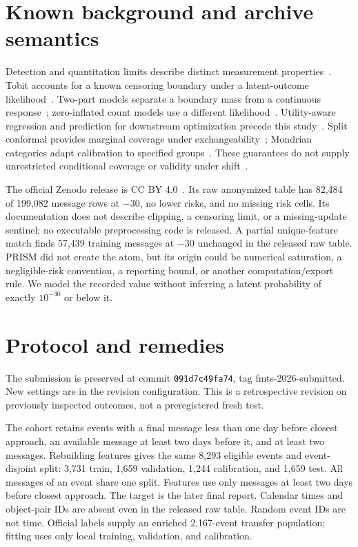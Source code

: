 \documentclass[10pt]{article}
\begin{document}
\section{Known background and archive semantics}
Detection and quantitation limits describe distinct measurement properties~\cite{currie}. Tobit accounts for a known censoring boundary under a latent-outcome likelihood~\cite{tobin}. Two-part models separate a boundary mass from a continuous response~\cite{cragg}; zero-inflated count models use a different likelihood~\cite{lambert}. Utility-aware regression and prediction for downstream optimization precede this study~\cite{torgo,spo}. Split conformal provides marginal coverage under exchangeability~\cite{lei}; Mondrian categories adapt calibration to specified groups~\cite{mondrian}. These guarantees do not supply unrestricted conditional coverage or validity under shift~\cite{barber}.

The official Zenodo release is CC BY 4.0~\cite{data}. Its raw anonymized table has 82,484 of 199,082 message rows at $-30$, no lower risks, and no missing risk cells. Its documentation does not describe clipping, a censoring limit, or a missing-update sentinel; no executable preprocessing code is released. A partial unique-feature match finds 57,439 training messages at $-30$ unchanged in the released raw table. PRISM did not create the atom, but its origin could be numerical saturation, a negligible-risk convention, a reporting bound, or another computation/export rule. We model the recorded value without inferring a latent probability of exactly $10^{-30}$ or below it.

\section{Protocol and remedies}
The submission is preserved at commit \texttt{091d7c49fa74}, tag fmts-2026-submitted. New settings are in the revision configuration. This is a retrospective revision on previously inspected outcomes, not a preregistered fresh test.

The cohort retains events with a final message less than one day before closest approach, an available message at least two days before it, and at least two messages. Rebuilding features gives the same 8,293 eligible events and event-disjoint split: 3,731 train, 1,659 validation, 1,244 calibration, and 1,659 test. All messages of an event share one split. Features use only messages at least two days before closest approach. The target is the later final report. Calendar times and object-pair IDs are absent even in the released raw table. Random event IDs are not time. Official labels supply an enriched 2,167-event transfer population; fitting uses only local training, validation, and calibration.
\end{document}
